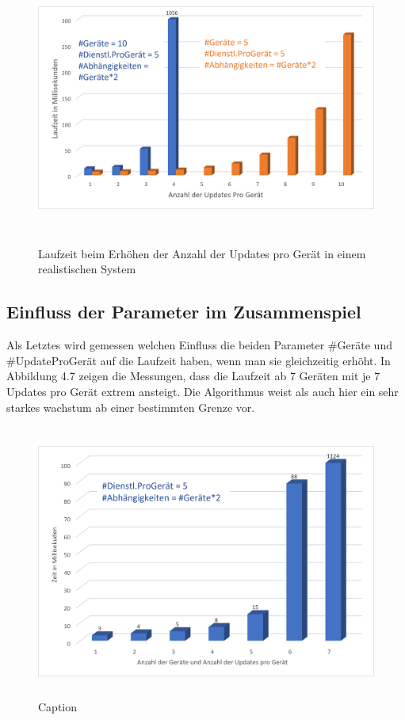 \begin{figure}[h]
\begin{center}
\includegraphics[width=14cm,height=9cm]{"Steigende Updatezahl real"}
\caption{Laufzeit beim Erhöhen der Anzahl der Updates pro Gerät in einem realistischen System}
\label{fig:Prob1:MEA}
\end{center}
\end{figure}

\newpage
\subsection{Einfluss der Parameter im Zusammenspiel}
Als Letztes wird gemessen welchen Einfluss die beiden Parameter \#Geräte und \#UpdateProGerät auf die Laufzeit haben, wenn man sie gleichzeitig erhöht.
In Abbildung 4.7 zeigen die Messungen, dass die Laufzeit ab 7 Geräten mit je 7 Updates pro Gerät extrem ansteigt. Die Algorithmus weist als auch hier
ein sehr starkes wachstum ab einer bestimmten Grenze vor.
\begin{figure}[h]
\begin{center}
\includegraphics[width=14cm,height=9cm]{"Beides"}
\caption{Caption}
\label{fig:Prob1:MEA}
\end{center}
\end{figure}

